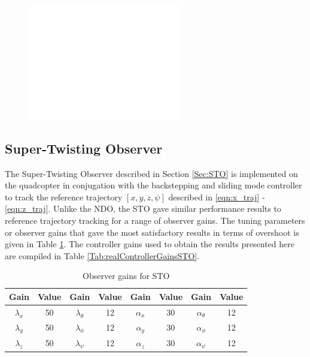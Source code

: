 \documentclass[letterpaper%
, twoside%
, 12pt%
,memoire%
, english%
,creativecommons,hyperref%
]{thETS}
\theoremstyle{newThmStyle}
\begin{document}
\begin{figure}[H]
	\includegraphics[width=0.6\textwidth]{Figures/blank.png}
\end{figure}
\FloatBarrier

\subsection{Super-Twisting Observer}
The Super-Twisting Observer described in Section \ref{Sec:STO} is implemented on the quadcopter in conjugation with the backstepping and sliding mode controller to track the reference trajectory $[x,y,z,\psi]$ described in \eqref{eqn:x_traj} - \eqref{eqn:z_traj}. Unlike the NDO, the STO gave similar performance results to reference trajectory tracking for a range of observer gains. The tuning parameters or observer gains that gave the most satisfactory results in terms of overshoot is given in Table \ref{Tab:realSTOGains}. The controller gains used to obtain the results presented here are compiled in Table \ref{Tab:realControllerGainsSTO}. 

\begin{table}
\parbox{0.65\textwidth}{\caption{Observer gains for STO} \label{Tab:realSTOGains}} 
\begin{tabular}{|c|c|c|c|c|c|c|c|}
\hline
{\bf Gain}&{\bf Value}&{\bf Gain}&{\bf Value}&{\bf Gain}&{\bf Value}&{\bf Gain}&{\bf Value}\\ \hline
$\lambda_x$ & 50 & $\lambda_\theta$  & 12  & $\alpha_x$ & 30 & $\alpha_\theta$  & 12  \\ \hline
$\lambda_y$ & 50 & $\lambda_\phi$    & 12  & $\alpha_y$ & 30 & $\alpha_\phi$    & 12  \\ \hline
$\lambda_z$ & 50 & $\lambda_\psi$    & 12  & $\alpha_z$ & 30 & $\alpha_\psi$    & 12  \\ \hline 
\end{tabular}
\end{table}
\end{document}
